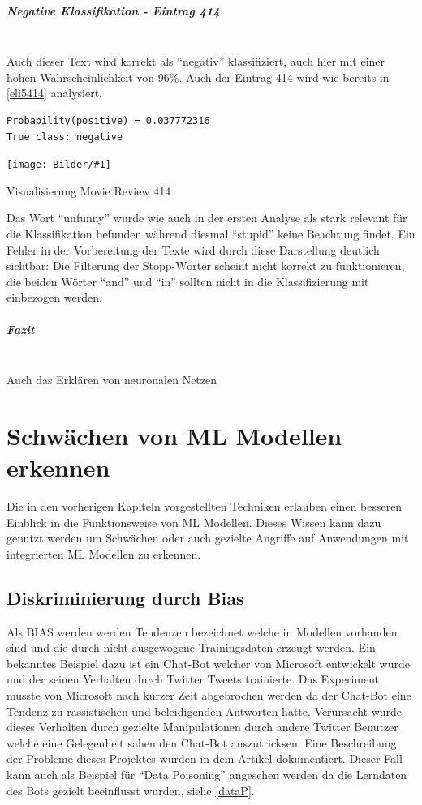 \documentclass[
  12pt, %
  a4paper, %
  oneside, %
  openany, 
  numbers=noenddot, %
  BCOR=5mm, %
  parskip=half*, %
  thesis, %
]{bfhbook}
\newcommand{\parag}[1]{\paragraph*{#1}\mbox{}\\}
\newcommand{\imgText}[3]{
\begin{center}
    \begin{minipage}[t]{0.6\textwidth}
    		\vspace{0pt}
		\texttt{[image: Bilder/\#1]}
		\caption{#2}
	\end{minipage}\hfill
    \begin{minipage}[t]{0.4\textwidth}
    		\vspace{5pt}
  		#3
    \end{minipage}
\end{center}
}
\begin{document}
\parag{Negative Klassifikation - Eintrag 414}
Auch dieser Text wird korrekt als ``negativ'' klassifiziert, auch hier mit einer hohen Wahrscheinlichkeit von 96\%.
Auch der Eintrag 414 wird wie bereits in \ref{eli5414} analysiert.
\begin{lstlisting}
Probability(positive) = 0.037772316
True class: negative
\end{lstlisting}
\imgText{MovieReview-LSTM-Display-414.PNG}{Visualisierung Movie Review 414}{
Das Wort ``unfunny'' wurde wie auch in der ersten Analyse als stark relevant für die Klassifikation befunden während diesmal ``stupid'' keine Beachtung findet. Ein Fehler in der Vorbereitung der Texte wird durch diese Darstellung deutlich sichtbar: Die Filterung der Stopp-Wörter scheint nicht korrekt zu funktionieren, die beiden Wörter ``and'' und ``in'' sollten nicht in die Klassifizierung mit einbezogen werden.
}

\parag{Fazit}
Auch das Erklären von neuronalen Netzen

\chapter{Schwächen von ML Modellen erkennen}
Die in den vorherigen Kapiteln vorgestellten Techniken erlauben einen besseren Einblick in die Funktionsweise von \Gls{ML} Modellen. Dieses Wissen kann dazu genutzt werden um Schwächen oder auch gezielte Angriffe auf Anwendungen mit integrierten \Gls{ML} Modellen zu erkennen.

\section{Diskriminierung durch Bias}
Als \Gls{BIAS} werden werden Tendenzen bezeichnet welche in Modellen vorhanden sind und die durch nicht ausgewogene Trainingsdaten erzeugt werden.
Ein bekanntes Beispiel dazu ist ein Chat-Bot welcher von Microsoft entwickelt wurde und der seinen Verhalten durch Twitter Tweets trainierte. Das Experiment musste von Microsoft nach kurzer Zeit abgebrochen werden da der Chat-Bot eine Tendenz zu rassistischen und beleidigenden Antworten hatte. Verursacht wurde dieses Verhalten durch gezielte Manipulationen durch andere Twitter Benutzer welche eine Gelegenheit sahen den Chat-Bot auszutricksen. Eine Beschreibung der Probleme dieses Projektes wurden in dem Artikel \parencite{msTay} dokumentiert.
Dieser Fall kann auch als Beispiel für ``Data Poisoning'' angesehen werden da die Lerndaten des Bots gezielt beeinflusst wurden, siehe \ref{dataP}.
\end{document}
